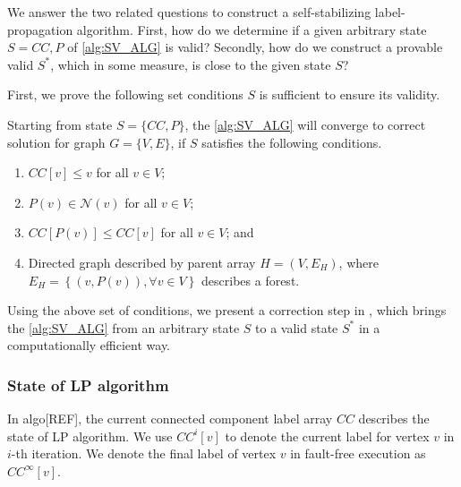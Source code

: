 We answer the two related questions to construct a self-stabilizing label-
propagation algorithm. First, how do we determine if a given arbitrary state
$S={CC, P}$ of \cref{alg:SV_ALG} is valid? Secondly,  how do we construct a
provable valid $S^{*}$, which in some measure, is close to the given state $S$?

First, we prove the following set conditions $S$ is sufficient to ensure its
validity.  
\begin{thm}
\label{thm:ss_valid}
Starting from state $S= \{CC,P \}$, the \cref{alg:SV_ALG} will converge to correct solution for graph $G=\{ V, E\}$, if $S$ satisfies the following conditions.
\begin{enumerate}
\item $CC[v]\leq v$  for all $v\in V$;
\item $P(v)\in\mathcal{N}(v)$ for all $v\in V$;
\item $CC[P(v)]\leq CC[v]$ for all $v\in V$; and 
\item Directed graph described by parent array $H=(V,E_{H})$, where $E_{H}=\left\{ (v,P(v)),\forall v\in V\right\} $
describes a forest. 
\end{enumerate}
\end{thm}
Using the above  set of conditions, we present a  correction step in , which brings the
\cref{alg:SV_ALG} from an arbitrary state $S$ to a valid state $S^{*}$ in a
computationally efficient way.





\subsubsection*{State of LP algorithm}

In algo{[}REF{]}, the current connected component label array $CC$
describes the state of LP algorithm. We use $CC^{i}[v]$ to denote
the current label for vertex $v$ in $i$-th iteration. We denote
the final label of vertex $v$ in fault-free execution as $CC^{\infty}[v]$. 

